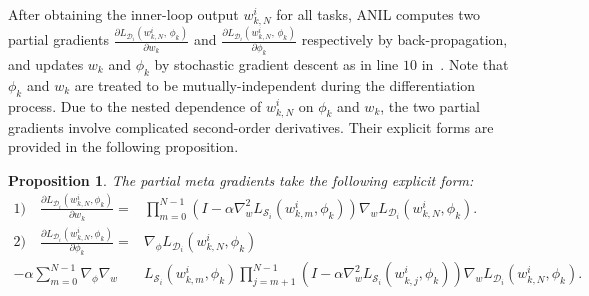 \documentclass{osudissert96}
\newtheorem{proposition}{Proposition}
\begin{document}
After obtaining the inner-loop output $w^i_{k,N}$ for all tasks, ANIL computes two partial gradients $\frac{\partial L_{\mathcal{D}_i}(w^i_{k,N},\,\phi_k)}{\partial { w_k}}$ and $\frac{\partial L_{\mathcal{D}_i}(w^i_{k,N},\,\phi_k)}{\partial {\phi_k}}$ 
respectively by back-propagation, and updates $w_k$ and $\phi_k$ by stochastic gradient descent as in line $10$ in~.
Note that $\phi_k$ and $w_k$ are treated to be mutually-independent during the differentiation process. Due to the nested dependence of $w_{k,N}^i$ on $\phi_k$ and $w_k$, the two partial gradients involve complicated second-order derivatives. Their explicit forms are provided in the following proposition. 
\begin{proposition}\label{le:gd_form}
The partial meta gradients take the following explicit form: 
\begin{align*}
{1)} \quad \frac{\partial L_{\mathcal{D}_i}( w^i_{k,N}, \phi_k)}{\partial w_k} =& \prod_{m=0}^{N-1}(I - \alpha \nabla_w^2L_{\mathcal{S}_i}(w_{k,m}^i,\phi_k)) \nabla_{w} L_{\mathcal{D}_i} (w_{k,N}^i,\phi_k). \nonumber
\\ {2)}\quad \frac{\partial L_{\mathcal{D}_i}( w^i_{k,N}, \phi_k)}{\partial \phi_k} =&
\nabla_\phi L_{\mathcal{D}_i}(w_{k,N}^i,\phi_k) \nonumber
\\ -\alpha \sum_{m=0}^{N-1}\nabla_\phi\nabla_w &L_{\mathcal{S}_i}(w_{k,m}^i,\phi_k) \prod_{j=m+1}^{N-1}(I-\alpha\nabla_w^2L_{\mathcal{S}_i}(w_{k,j}^i,\phi_k))\nabla_w L_{\mathcal{D}_i}(w_{k,N}^i,\phi_k).
\end{align*}
\end{proposition}
\end{document}
